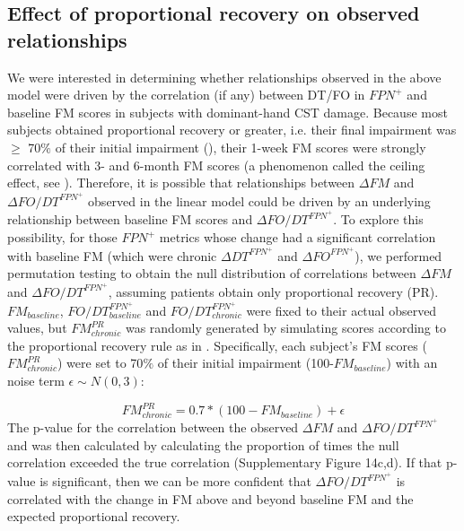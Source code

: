 \documentclass[phd,tocprelim]{cornell}
\begin{document}
	\subsection*{Effect of proportional recovery on observed relationships}
    We were interested in determining whether relationships observed in the above model were driven by the correlation (if any) between DT/FO in $FPN^+$ and baseline FM scores in subjects with dominant-hand CST damage. Because most subjects obtained proportional recovery or greater, i.e. their final impairment was $\ge$ 70$\%$ of their initial impairment (\cite{Kundert2019-ou}), their 1-week FM scores were strongly correlated with 3- and 6-month FM scores (a phenomenon called the ceiling effect, see \cite{Hope2019-da}). Therefore, it is possible that  relationships between $\Delta FM$ and $\Delta FO/DT^{FPN^+}$ observed in the linear model could be driven by an underlying relationship between baseline FM scores and $\Delta FO/DT^{FPN^+}$. To explore this possibility, for those $FPN^+$ metrics whose change had a significant correlation with baseline FM (which were chronic  $\Delta DT^{FPN^+}$ and $\Delta FO^{FPN^+}$), we performed permutation testing to obtain the null distribution of correlations between $\Delta FM$ and $\Delta FO/DT^{FPN^+}$, assuming patients obtain only proportional recovery (PR). $FM_{baseline}$, $FO/DT^{FPN^+}_{baseline}$ and $FO/DT^{FPN^+}_{chronic}$ were fixed to their actual observed values, but $FM^{PR}_{chronic}$ was randomly generated by simulating scores according to the proportional recovery rule as in \cite{Kundert2019-ou}. Specifically, each subject's FM scores ($FM^{PR}_{chronic}$) were set to 70$\%$ of their initial impairment (100-$FM_{baseline}$) with an noise term $\epsilon \sim N(0,3)$:
    
    \begin{equation}
        FM^{PR}_{chronic} = 0.7*(100-FM_{baseline}) + \epsilon
    \end{equation}
    The p-value for the correlation between the observed $\Delta FM$ and $\Delta FO/DT^{FPN^+}$ and was then calculated by calculating the proportion of times the null correlation exceeded the true correlation (Supplementary Figure 14c,d). If that p-value is significant, then we can be more confident that $\Delta FO/DT^{FPN^+}$ is correlated with the change in FM above and beyond baseline FM and the expected proportional recovery.
    
\end{document}
